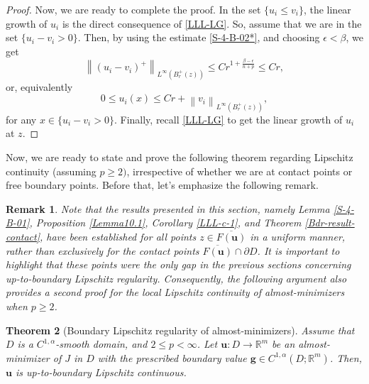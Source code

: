 \documentclass{amsart}
\newtheorem{theorem}{Theorem}[section]
\newtheorem{remark}[theorem]{Remark}
\begin{document}
\begin{proof}
Now, we are ready to complete the proof. 
In the set $\{u_i \leq v_i\}$, the linear growth of $u_i$ is the direct consequence of \eqref{LLL-LG}. So, assume that we are in the set $\{u_i-v_i>0\}$. Then, by using the estimate \eqref{S-4-B-02*}, and choosing $\epsilon<\beta$, we get 
\begin{equation} 
\label{LLL-e-13} 
\left\| \left(u_i - v_i\right)^+ \right\|_{L^{\infty} \left(B_r^+(z)\right)} \leq C r^{1+\frac{\beta-\epsilon}{n+p}} \leq C r, 
\end{equation} 
or, equivalently
$$ 0 \leq u_i(x) \leq C r + \left\| v_i \right\|_{L^{\infty} \left(B_{r}^+(z) \right)}, $$
for any $x \in \{u_i-v_i>0\}$. Finally, recall \eqref{LLL-LG} to get
 the linear growth of $u_i$ at $z$.
\end{proof}

Now, we are ready to state and prove the following theorem regarding Lipschitz continuity (assuming 
$p \geq 2)$, irrespective of whether we are at contact points or free boundary points. Before that, let's emphasize the following remark.

\begin{remark}
\label{LLL-rem}
Note that the results presented in this section, namely Lemma \ref{S-4-B-01}, Proposition \ref{Lemma10.1}, Corollary \ref{LLL-c-1}, and Theorem \ref{Bdr-result-contact}, have been established for all points $z \in \overline{F(\mathbf{u})}$ in a uniform manner, rather than exclusively for the contact points $\overline{F(\mathbf{u})} \cap \partial D$. It is important to highlight that these points were the only gap in the previous sections concerning up-to-boundary Lipschitz regularity. Consequently, the following argument also provides a second proof for the local Lipschitz continuity of almost-minimizers when $p \geq 2$.
\end{remark}

\begin{theorem}[Boundary Lipschitz regularity of almost-minimizers]
\label{T1-up-to}
Assume that $D$ is a $C^{1,\alpha}$-smooth domain, and $ 2\leq p<\infty$. Let $\mathbf{u} :D \to \mathbb{R}^m $ be an almost-minimizer of $J$ in $D$ with the prescribed boundary value $\mathbf{g} \in C^{1,\alpha}(D;\mathbb{R}^m)$. Then, $\mathbf{u}$ is up-to-boundary Lipschitz continuous. 
\end{theorem}
\end{document}

